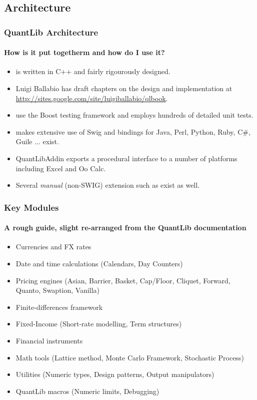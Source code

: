 \documentclass[compress]{beamer}
\begin{document}
\subsection{Architecture}
\begin{frame}
  \frametitle{QuantLib Architecture}
  \framesubtitle{How is it put togetherm and how do I use it?}
  \begin{itemize}[<+-|alert@+>]
  \item \QL is written in C++ and fairly rigourously designed. 
  \item Luigi Ballabio has draft chapters on the \QL design and
    implementation at \url{http://sites.google.com/site/luigiballabio/qlbook}.
  \item \QL use the Boost testing framework and employs hundreds
    of detailed unit tests. 
  \item \QL makes extensive use of Swig and bindings for Java, Perl, 
    Python, Ruby, C\#, Guile ... exist. 
  \item QuantLibAddin exports a procedural interface to a number of platforms
    including Excel and Oo Calc.
  \item Several \textsl{manual} (non-SWIG) extension such as 
    exist as well.
  \end{itemize}
\end{frame}

\begin{frame}
  \frametitle{Key Modules}
  \framesubtitle{A rough guide, slight re-arranged from the QuantLib documentation}
  \begin{itemize}[<+-|alert@+>]
  \item Currencies and FX rates
  \item Date and time calculations (Calendars, Day Counters)
  \item Pricing engines (Asian, Barrier, Basket, Cap/Floor, Cliquet, Forward, Quanto,
    Swaption, Vanilla)
  \item Finite-differences framework
  \item Fixed-Income (Short-rate modelling, Term structures)
  \item Financial instruments
  \item Math tools (Lattice method, Monte Carlo Framework, Stochastic Process)
  \item Utilities (Numeric types, Design patterns, Output manipulators)
  \item QuantLib macros (Numeric limits, Debugging)
  \end{itemize}
\end{frame}
\end{document}
